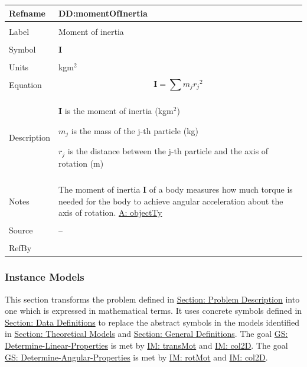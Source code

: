 \documentclass[12pt]{article}
\begin{document}
\noindent \begin{minipage}{\textwidth}
\begin{tabular}{p{} p{}}
\toprule \textbf{Refname} & \textbf{DD:momentOfInertia}
\label{DD:momentOfInertia}
\\ \midrule \\
Label & Moment of inertia
\\ \midrule \\
Symbol & $\mathbf{I}$
\\ \midrule \\
Units & kg$\text{m}^{2}$
\\ \midrule \\
Equation & \begin{displaymath}
           \mathbf{I}=\displaystyle\sum{{m_{j}} {r_{j}}^{2}}
           \end{displaymath}
\\ \midrule \\
Description & \begin{symbDescription}
              \item{$\mathbf{I}$ is the moment of inertia (kg$\text{m}^{2}$)}
              \item{${m_{j}}$ is the mass of the j-th particle (kg)}
              \item{${r_{j}}$ is the distance between the j-th particle and the axis of rotation (m)}
              \end{symbDescription}
\\ \midrule \\
Notes & The moment of inertia $\mathbf{I}$ of a body measures how much torque is needed for the body to achieve angular acceleration about the axis of rotation.
        \hyperref[assumpOT]{A: objectTy}
\\ \midrule \\
Source & --
\\ \midrule \\
RefBy & 
\\ \bottomrule \end{tabular}
\end{minipage}
\subsubsection{Instance Models}
\label{Sec:IMs}
This section transforms the problem defined in \hyperref[Sec:ProbDesc]{Section: Problem Description} into one which is expressed in mathematical terms. It uses concrete symbols defined in \hyperref[Sec:DDs]{Section: Data Definitions} to replace the abstract symbols in the models identified in \hyperref[Sec:TMs]{Section: Theoretical Models} and \hyperref[Sec:GDs]{Section: General Definitions}.
The goal \hyperref[linearGS]{GS: Determine-Linear-Properties} is met by \hyperref[IM:transMot]{IM: transMot} and \hyperref[IM:col2D]{IM: col2D}. The goal \hyperref[angularGS]{GS: Determine-Angular-Properties} is met by \hyperref[IM:rotMot]{IM: rotMot} and \hyperref[IM:col2D]{IM: col2D}.
\par~
\end{document}
